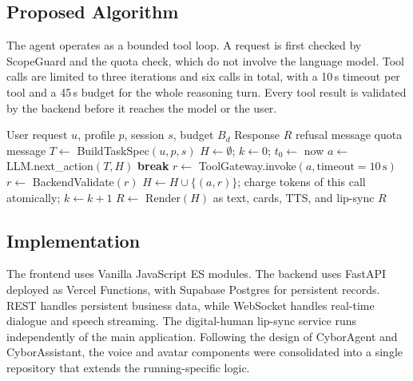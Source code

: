 \subsection{Proposed Algorithm}
The agent operates as a bounded tool loop. A request is first checked by ScopeGuard and the quota check, which do not involve the language model. Tool calls are limited to three iterations and six calls in total, with a 10\,s timeout per tool and a 45\,s budget for the whole reasoning turn. Every tool result is validated by the backend before it reaches the model or the user.

\begin{algorithm}[t]
\caption{FitnessCoachAgent Loop}
\label{alg:agent}
\begin{algorithmic}[1]
\Require User request $u$, profile $p$, session $s$, budget $B_d$
\Ensure Response $R$
  \State \Return refusal message
\EndIf
{}
  \State \Return quota message
\EndIf
\State $T \gets$ BuildTaskSpec$(u, p, s)$
\State $H \gets \emptyset$; $k \gets 0$; $t_0 \gets$ now
  \State $a \gets$ LLM.next\_action$(T, H)$
    \State \textbf{break}
  \EndIf
  \State $r \gets$ ToolGateway.invoke$(a, \text{timeout} = 10\,\text{s})$
  \State $r \gets$ BackendValidate$(r)$
  \State $H \gets H \cup \{(a, r)\}$; charge tokens of this call atomically; $k \gets k + 1$
\EndWhile
\State $R \gets$ Render$(H)$ as text, cards, TTS, and lip-sync
\State \Return $R$
\end{algorithmic}
\end{algorithm}

\subsection{Implementation}
The frontend uses Vanilla JavaScript ES modules. The backend uses FastAPI deployed as Vercel Functions, with Supabase Postgres for persistent records. REST handles persistent business data, while WebSocket handles real-time dialogue and speech streaming. The digital-human lip-sync service runs independently of the main application. Following the design of CyborAgent and CyborAssistant, the voice and avatar components were consolidated into a single repository that extends the running-specific logic.
